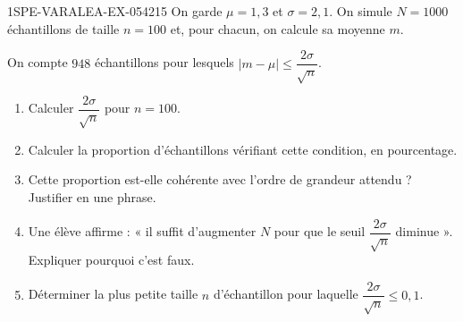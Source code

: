 \begin{exercice}{1SPE-VARALEA-EX-054}{2}{15}
On garde $\mu = 1{,}3$ et $\sigma = 2{,}1$. On simule $N = 1000$ échantillons
de taille $n = 100$ et, pour chacun, on calcule sa moyenne $m$.

On compte $948$ échantillons pour lesquels
$|m - \mu| \leq \dfrac{2\sigma}{\sqrt{n}}$.

\begin{enumerate}
  \item Calculer $\dfrac{2\sigma}{\sqrt{n}}$ pour $n = 100$.
  \item Calculer la proportion d'échantillons vérifiant cette condition,
        en pourcentage.
  \item Cette proportion est-elle cohérente avec l'ordre de grandeur attendu ?
        Justifier en une phrase.
  \item Une élève affirme : « il suffit d'augmenter $N$ pour que le seuil
        $\dfrac{2\sigma}{\sqrt{n}}$ diminue ». Expliquer pourquoi c'est faux.
  \item Déterminer la plus petite taille $n$ d'échantillon pour laquelle
        $\dfrac{2\sigma}{\sqrt{n}} \leq 0{,}1$.
\end{enumerate}
\end{exercice}
